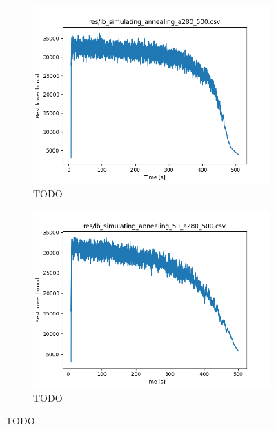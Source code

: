 \begin{figure}
\begin{subfigure}{.5\columnwidth}
	\includegraphics[width=\columnwidth]{../res/lb_simulating_annealing_a280_500.png}
	\caption{TODO}
	\label{fig:simultaing_annealing_perform_time}	
	\end{subfigure}
	\begin{subfigure}{.5\columnwidth}
	\centering
	\includegraphics[width=\columnwidth]{../res/lb_simulating_annealing_50_a280_500.png}
	\caption{TODO}
	\label{fig:simultaing_annealing_perform_time}
	\end{subfigure}
\end{figure}

